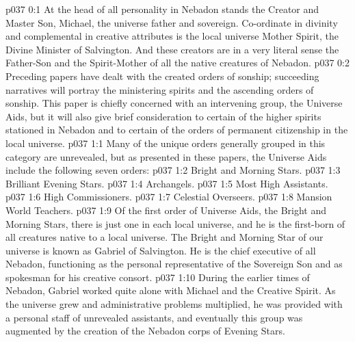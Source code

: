 \author{Brilliant Evening Star}
\vs p037 0:1 At the head of all personality in Nebadon stands the Creator and Master Son, Michael, the universe father and sovereign. Co\hyp{}ordinate in divinity and complemental in creative attributes is the local universe Mother Spirit, the Divine Minister of Salvington. And these creators are in a very literal sense the Father\hyp{}Son and the Spirit\hyp{}Mother of all the native creatures of Nebadon.
\vs p037 0:2 Preceding papers have dealt with the created orders of sonship; succeeding narratives will portray the ministering spirits and the ascending orders of sonship. This paper is chiefly concerned with an intervening group, the Universe Aids, but it will also give brief consideration to certain of the higher spirits stationed in Nebadon and to certain of the orders of permanent citizenship in the local universe.
\vs p037 1:1 Many of the unique orders generally grouped in this category are unrevealed, but as presented in these papers, the Universe Aids include the following seven orders:
\vs p037 1:2 \bibnobreakspace Bright and Morning Stars.
\vs p037 1:3 \bibnobreakspace Brilliant Evening Stars.
\vs p037 1:4 \bibnobreakspace Archangels.
\vs p037 1:5 \bibnobreakspace Most High Assistants.
\vs p037 1:6 \bibnobreakspace High Commissioners.
\vs p037 1:7 \bibnobreakspace Celestial Overseers.
\vs p037 1:8 \bibnobreakspace Mansion World Teachers.
\vs p037 1:9 \pc Of the first order of Universe Aids, the Bright and Morning Stars, there is just one in each local universe, and he is the first\hyp{}born of all creatures native to a local universe. The Bright and Morning Star of our universe is known as Gabriel of Salvington. He is the chief executive of all Nebadon, functioning as the personal representative of the Sovereign Son and as spokesman for his creative consort.
\vs p037 1:10 During the earlier times of Nebadon, Gabriel worked quite alone with Michael and the Creative Spirit. As the universe grew and administrative problems multiplied, he was provided with a personal staff of unrevealed assistants, and eventually this group was augmented by the creation of the Nebadon corps of Evening Stars.
